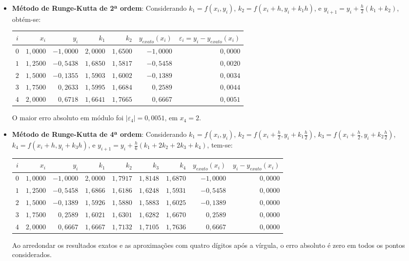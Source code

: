 \documentclass[12pt,a4paper]{article}
\begin{document}
\begin{enumerate}
\begin{enumerate}
\begin{itemize}
\item \textbf{Método de Runge-Kutta de 2ª ordem}: Considerando
$k_1 = f(x_i, y_i)$,
$k_2 = f(x_i + h, y_i + k_1 h)$, e
$y_{i+1} = y_i + \frac{h}{2} (k_1 + k_2)$, obtém-se:
\medskip
\begin{center}
    \begin{tabular}{crrrrrr}
    \hline
      $i$ & $x_i$  & $y_i$ & $k_1$ & $k_2$ & $y_{exato}(x_i)$
      & $\varepsilon_i = y_i-y_{exato}(x_i)$ \\ \hline
    $0$ & $1,0000$ & $-1,0000$ & $2,0000$ & $1,6500$ & $-1,0000$ & $0,0000$ \\
    $1$ & $1,2500$ & $-0,5438$ & $1,6850$ & $1,5817$ & $-0,5458$ & $0,0020$ \\
    $2$ & $1,5000$ & $-0,1355$ & $1,5903$ & $1,6002$ & $-0,1389$ & $0,0034$ \\
    $3$ & $1,7500$ & $ 0,2633$ & $1,5995$ & $1,6684$ & $ 0,2589$ & $0,0044$ \\
    $4$ & $2,0000$ & $ 0,6718$ & $1,6641$ & $1,7665$ & $ 0,6667$ & $0,0051$ \\
    \hline
    \end{tabular}
\end{center}
\medskip
O maior erro absoluto em módulo foi $|\varepsilon_4| = 0,0051$, em $x_4 = 2$.

\item \textbf{Método de Runge-Kutta de 4ª ordem}: Considerando
$k_1 = f(x_i, y_i)$,
$k_2 = f(x_i + \frac{h}{2}, y_i + k_1 \frac{h}{2})$,
$k_3 = f(x_i + \frac{h}{2}, y_i + k_2 \frac{h}{2})$,
$k_4 = f(x_i +       h    , y_i + k_3 h)$, e
$y_{i+1} = y_i + \frac{h}{6} (k_1 + 2k_2 + 2k_3 + k_4)$, tem-se:
\begin{center}
   \begin{footnotesize}
      \begin{tabular}{crrrrrrrr}
      \hline
        $i$ & $x_i$  & $y_i$ & $k_1$ & $k_2$ & $k_3$ & $k_4$ & $y_{exato}(x_i)$
        & $y_i-y_{exato}(x_i)$ \\ \hline
      $0$ & $1,0000$ & $-1,0000$ & $2,0000$ & $1,7917$ & $1,8148$ & $1,6870$ & $-1,0000$ & $0,0000$ \\
      $1$ & $1,2500$ & $-0,5458$ & $1,6866$ & $1,6186$ & $1,6248$ & $1,5931$ & $-0,5458$ & $0,0000$ \\
      $2$ & $1,5000$ & $-0,1389$ & $1,5926$ & $1,5880$ & $1,5883$ & $1,6025$ & $-0,1389$ & $0,0000$ \\
      $3$ & $1,7500$ & $ 0,2589$ & $1,6021$ & $1,6301$ & $1,6282$ & $1,6670$ & $ 0,2589$ & $0,0000$ \\
      $4$ & $2,0000$ & $ 0,6667$ & $1,6667$ & $1,7132$ & $1,7105$ & $1,7636$ & $ 0,6667$ & $0,0000$ \\
      \hline
      \end{tabular}
   \end{footnotesize}
\end{center}
Ao arredondar os resultados exatos e as aproximações com quatro dígitos após a vírgula, o erro absoluto é zero em todos os pontos considerados.


\end{itemize}
\end{enumerate}
\end{enumerate}
\end{document}
